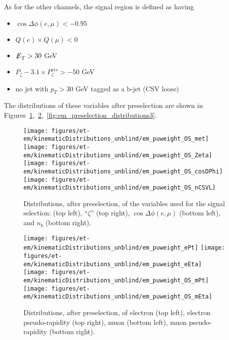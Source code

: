 As for the other channels, the signal region is defined as having
\begin{itemize}
  \item $\cos{\Delta \phi (e,\mu)}<-0.95$
  \item $Q(e) \times Q(\mu) < 0$
  \item ${\not\mathrel{E}}_T>30$ GeV
  \item $P_{\zeta}- 3.1 \times P_{\zeta}^{vis} > -50$ GeV
  \item no jet with $p_T>30$ GeV tagged as a b-jet (CSV loose)
\end{itemize}

The distributions of these variables after preselection are shown in
Figures~\ref{fig:em_preselection_distributions1},~\ref{fig:em_preselection_distributions2},~\ref{fig:em_preselection_distributions3}.

\begin{figure}[b]\centering
  \texttt{[image: figures/et-em/kinematicDistributions\_unblind/em\_puweight\_OS\_met]}
  \texttt{[image: figures/et-em/kinematicDistributions\_unblind/em\_puweight\_OS\_Zeta]} \\
  \texttt{[image: figures/et-em/kinematicDistributions\_unblind/em\_puweight\_OS\_cosDPhi]}
  \texttt{[image: figures/et-em/kinematicDistributions\_unblind/em\_puweight\_OS\_nCSVL]}
  \caption{\label{fig:em_preselection_distributions1} Distributions,
    after preselection, of the variables used for the \tetm signal
    selection: \ETslash (top left), ``$\zeta$'' (top right),
    $\cos{\Delta \phi (e,\mu)}$ (bottom left), and $n_b$ (bottom
    right).}
\end{figure}

\begin{figure}\centering
  \texttt{[image: figures/et-em/kinematicDistributions\_unblind/em\_puweight\_ePt]}
  \texttt{[image: figures/et-em/kinematicDistributions\_unblind/em\_puweight\_eEta]} \\
  \texttt{[image: figures/et-em/kinematicDistributions\_unblind/em\_puweight\_OS\_mPt]}
  \texttt{[image: figures/et-em/kinematicDistributions\_unblind/em\_puweight\_OS\_mEta]}
  \caption{\label{fig:em_preselection_distributions2} Distributions,
    after \tetm preselection, of electron \pt (top left), electron
    pseudo-rapidity (top right), muon \pt (bottom left), muon
    pseudo-rapidity (bottom right).}
\end{figure}

